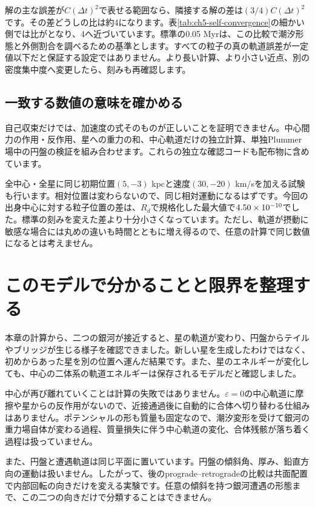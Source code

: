 解の主な誤差が$C(\Delta t)^2$で表せる範囲なら、隣接する解の差は$(3/4)C(\Delta t)^2$です。その差どうしの比は約4になります。表\ref{tab:ch5-self-convergence}の細かい側では比が\chfivevalLastRatio となり、4へ近づいています。標準の0.05 Myrは、この比較で潮汐形態と外側割合を調べるための基準とします。すべての粒子の真の軌道誤差が一定値以下だと保証する設定ではありません。より長い計算、より小さい近点、別の密度集中度へ変更したら、刻みも再確認します。

\subsection{一致する数値の意味を確かめる}
自己収束だけでは、加速度の式そのものが正しいことを証明できません。中心間力の作用・反作用、星への重力の和、中心軌道だけの独立計算、単独Plummer場中の円盤の検証を組み合わせます。これらの独立な確認コードも配布物に含めています。

全中心・全星に同じ初期位置$(5,-3)$ kpcと速度$(30,-20)$ km/sを加える試験も行います。相対位置は変わらないので、同じ相対運動になるはずです。今回の出身中心に対する粒子位置の差は、$R_d$で規格化した最大値で$4.50\times 10^{-10}$でした。標準の刻みを変えた差より十分小さくなっています。ただし、軌道が摂動に敏感な場合には丸めの違いも時間とともに増え得るので、任意の計算で同じ数値になるとは考えません。

\FloatBarrier
\section{このモデルで分かることと限界を整理する}
\label{sec:ch5-limits}
本章の計算から、二つの銀河が接近すると、星の軌道が変わり、円盤からテイルやブリッジが生じる様子を確認できました。新しい星を生成したわけではなく、初めからあった星を別の位置へ運んだ結果です。また、星のエネルギーが変化しても、中心の二体系の軌道エネルギーは保存されるモデルだと確認しました。

中心が再び離れていくことは計算の失敗ではありません。$\varepsilon=0$の中心軌道に摩擦や星からの反作用がないので、近接通過後に自動的に合体へ切り替わる仕組みはありません。ポテンシャルの形も質量も固定なので、潮汐変形を受けて銀河の重力場自体が変わる過程、質量損失に伴う中心軌道の変化、合体残骸が落ち着く過程は扱っていません。

また、円盤と遭遇軌道は同じ平面に置いています。円盤の傾斜角、厚み、鉛直方向の運動は扱いません。したがって、後のprograde--retrogradeの比較は共面配置で内部回転の向きだけを変える実験です。任意の傾斜を持つ銀河遭遇の形態まで、この二つの向きだけで分類することはできません。

